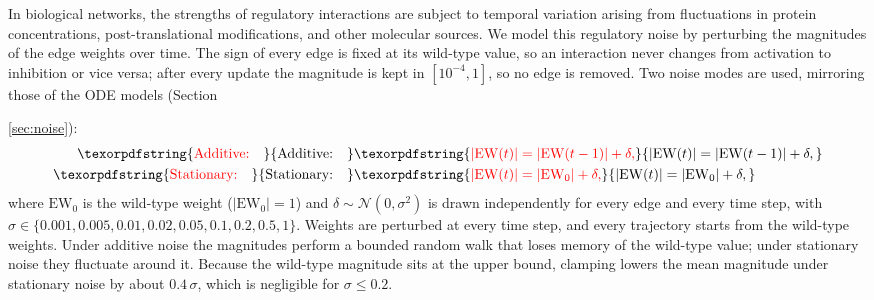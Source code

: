 \documentclass[11pt]{article}
\providecommand{\DIFaddtex}[1]{{\protect\color{red}#1}} %
\providecommand{\DIFdeltex}[1]{} %
\providecommand{\DIFaddbegin}{} %
\providecommand{\DIFaddend}{} %
\providecommand{\DIFdelbegin}{} %
\providecommand{\DIFdelend}{} %
\providecommand{\DIFadd}[1]{\texorpdfstring{\DIFaddtex{#1}}{#1}} %
\providecommand{\DIFdel}[1]{\texorpdfstring{\DIFdeltex{#1}}{}} %
\providecommand{\DIFaddincludegraphics}[2][]{\DIFOincludegraphics[#1]{#2}} %
\providecommand{\DIFdelincludegraphics}[2][]{}
\DeclareRobustCommand{\DIFaddbegin}{\DIFOaddbegin \let\includegraphics\DIFaddincludegraphics} %
\DeclareRobustCommand{\DIFaddend}{\DIFOaddend \let\includegraphics\DIFOincludegraphics} %
\DeclareRobustCommand{\DIFdelbegin}{\DIFOdelbegin \let\includegraphics\DIFdelincludegraphics} %
\DeclareRobustCommand{\DIFdelend}{\DIFOaddend \let\includegraphics\DIFOincludegraphics} %
\begin{document}
In biological networks, the strengths of regulatory interactions are subject to temporal variation arising from fluctuations in protein concentrations, post-translational modifications, and other molecular sources. We model this regulatory noise by perturbing the \DIFdelbegin \DIFdel{edge weights of the adjacency matrix }\DIFdelend \DIFaddbegin \DIFadd{magnitudes of the edge weights }\DIFaddend over time. \DIFdelbegin \DIFdel{Three }\DIFdelend \DIFaddbegin \DIFadd{The sign of every edge is fixed at its wild-type value, so an interaction never changes from activation to inhibition or vice versa; after every update the magnitude is kept in $[10^{-4}, 1]$, so no edge is removed. Two }\DIFaddend noise modes are \DIFdelbegin \DIFdel{implemented}\DIFdelend \DIFaddbegin \DIFadd{used}\DIFaddend , mirroring those \DIFdelbegin \DIFdel{used in the ODE-based simulations of small motifs }\DIFdelend \DIFaddbegin \DIFadd{of the ODE models }\DIFaddend (Section~\DIFdelbegin \DIFdel{\ref{sec:RACIPE}):
}%

\DIFdel{At each }\DIFdelend \DIFaddbegin \DIFadd{\ref{sec:noise}):
}\begin{align}
\DIFadd{\text{Additive:} \quad }& \DIFadd{|\mathrm{EW}(t)| = |\mathrm{EW}(t-1)| + \delta,}\\
\DIFadd{\text{Stationary:} \quad }& \DIFadd{|\mathrm{EW}(t)| = |\mathrm{EW}_0| + \delta,
}\end{align}
\DIFadd{where $\mathrm{EW}_0$ is the wild-type weight ($|\mathrm{EW}_0| = 1$) and $\delta \sim \mathcal{N}(0, \sigma^2)$ is drawn independently for every edge and every }\DIFaddend time step, \DIFdelbegin \DIFdel{a perturbation drawn from $\mathcal{N}(0, \sigma^2)$ is added to each edge weight independently of its current value:
}%
\DIFdel{Edge weightsare clipped to $[-1, 1]$ after each update to preserve the biological interpretation of interaction strengths. }\DIFdelend \DIFaddbegin \DIFadd{with $\sigma \in \{0.001, 0.005, 0.01, 0.02, 0.05, 0.1, 0.2, 0.5, 1\}$. Weights are perturbed at every time step, and every trajectory starts from the wild-type weights. Under additive noise the magnitudes perform a bounded random walk that loses memory of the wild-type value; under stationary noise they fluctuate around it. Because the wild-type magnitude sits at the upper bound, clamping lowers the mean magnitude under stationary noise by about $0.4\,\sigma$, which is negligible for $\sigma \le 0.2$.
}\DIFaddend 
\end{document}
